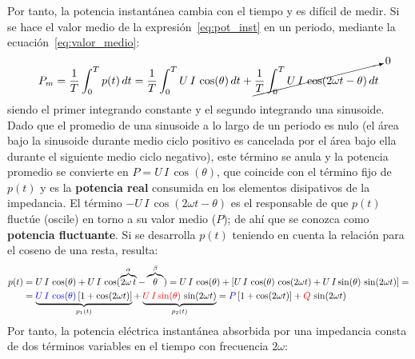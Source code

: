 	Por tanto, la potencia instantánea cambia con el tiempo y es
        difícil de medir. Si se hace el valor medio de la
        expresión~\eqref{eq:pot_inst} en un periodo, mediante la
        ecuación~\eqref{eq:valor_medio}:
	\begin{equation*}
          P_m=\dfrac{1}{T}\int_{0}^{T}p(t)\,dt=\dfrac{1}{T}\int_{0}^{T}U\,I\,\cos(\theta)\,dt+\cancelto{0}{\dfrac{1}{T}\int_{0}^{T}U\,I\,\cos(2\omega t-\theta)\,dt}
	\end{equation*}
	siendo el primer integrando constante y el segundo integrando
        una sinusoide. Dado que el promedio de una sinusoide a lo
        largo de un periodo es nulo (el área bajo la sinusoide durante
        medio ciclo positivo es cancelada por el área bajo ella
        durante el siguiente medio ciclo negativo), este término se
        anula y la potencia promedio se convierte en
        $P=U\,I\,\cos(\theta)$, que coincide con el término fijo de
        $p(t)$ y es la \textbf{potencia real} consumida en los
        elementos disipativos de la impedancia. El término
        $-U\,I\,\cos(2\omega t-\theta)$ es el responsable de que
        $p(t)$ fluctúe (oscile) en torno a su valor medio ($P$); de
        ahí que se conozca como \textbf{potencia fluctuante}. Si se
        desarrolla $p(t)$ teniendo en cuenta la relación para el
        coseno de una resta, resulta:
	\begin{align*}
          p(t)&=U\,I\,\cos(\theta)+U\,I\,\cos(\overbrace{2\omega\,t}^{\alpha}-\overbrace{\theta}^{\beta})=U\,I\,\cos(\theta)+\left[ U\,I\,\cos(\theta)\,\cos(2\omega t) + U\,I\sin(\theta)\,\sin(2\omega t)\right]=\\
              &=\underbrace{{\color{blue}U\,I\,\cos(\theta)}\left[1+\cos(2\omega t)\right]}_{p_1(t)} + \underbrace{{\color{red}U\,I\sin(\theta)}\,\sin(2\omega t)}_{p_2(t)}={\color{blue}P}\left[1+\cos(2\omega t)\right] + {\color{red}Q}\,\sin(2\omega t)
	\end{align*}
	Por tanto, la potencia eléctrica instantánea absorbida por una
        impedancia consta de dos términos variables en el tiempo con
        frecuencia $2\omega$:
